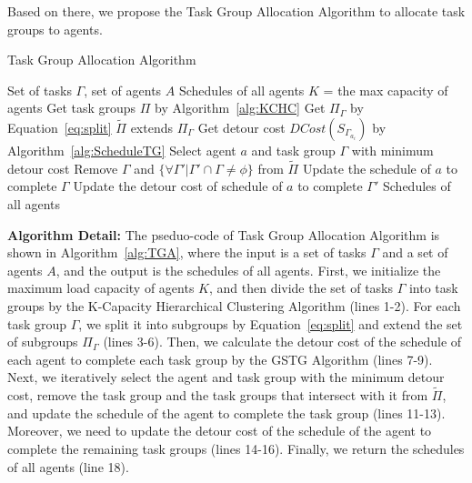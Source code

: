 \documentclass[sigconf,anonymous]{aamas}
\begin{document}
Based on there,
we propose the Task Group Allocation Algorithm to allocate task groups to agents.


\begin{algorithm}[htbp]
\caption{Task Group Allocation Algorithm}
\label{alg:TGA}
\begin{algorithmic}[1]
\Require Set of tasks $\Gamma$, set of agents $A$ %
\Ensure Schedules of all agents %
\State $K$ = the max capacity of agents
\State Get task groups $\Pi$ by Algorithm~\ref{alg:KCHC}
\For {$\Gamma \in \Pi$}
    \State Get $\Pi_{\Gamma}$ by Equation~\ref{eq:split}
    \State ${\tilde{\Pi}}$ extends $\Pi_{\Gamma}$
\EndFor
{}
    \State Get detour cost $DCost(S_{\Gamma_{a_i}})$ by Algorithm~\ref{alg:ScheduleTG}
\EndFor
{}
    \State Select agent $a$ and task group $\Gamma$ with minimum detour cost
    \State Remove $\Gamma$ and $\{\forall \Gamma'| \Gamma'\cap \Gamma \neq \phi \} $ from ${\tilde{\Pi}}$
    \State Update the schedule of $a$ to complete $\Gamma$
        \State Update the detour cost of schedule of $a$ to complete $\Gamma'$
    \EndFor
\EndWhile
\State \Return Schedules of all agents
\end{algorithmic}
\end{algorithm}

\textbf{Algorithm Detail:}
The pseduo-code of Task Group Allocation Algorithm is shown in Algorithm~\ref{alg:TGA},
where the input is a set of tasks $\Gamma$ and a set of agents $A$,
and the output is the schedules of all agents.
First, we initialize the maximum load capacity of agents $K$,
and then divide the set of tasks $\Gamma$ into task groups by the K-Capacity Hierarchical Clustering Algorithm (lines 1-2).
For each task group $\Gamma$, we split it into subgroups by Equation~\ref{eq:split}
and extend the set of subgroups $\Pi_{\Gamma}$ (lines 3-6).
Then, we calculate the detour cost of the schedule of each agent to complete each task group by the GSTG Algorithm (lines 7-9).
Next, we iteratively select the agent and task group with the minimum detour cost,
remove the task group and the task groups that intersect with it from $\tilde{\Pi}$,
and update the schedule of the agent to complete the task group (lines 11-13).
Moreover, we need to update the detour cost of the schedule of the agent to complete the remaining task groups (lines 14-16).
Finally, we return the schedules of all agents (line 18).
\end{document}
